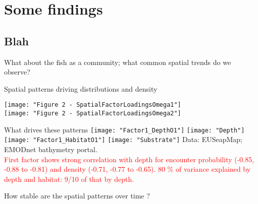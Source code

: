 \documentclass[xcolor=x11names,compress]{beamer}
\renewcommand{\(}{\begin{columns}}
\renewcommand{\)}{\end{columns}}
\newcommand{\<}[1]{\begin{column}{#1}}
\renewcommand{\>}{\end{column}}
\begin{document}
\section{Some findings}
\subsection{Blah}

\begin{frame}
\end{frame}


\begin{frame}
	What about the fish as a community; what common spatial trends do we observe?
\end{frame}


\begin{frame}{Spatial patterns driving distributions and density}

\centering
\texttt{[image: "Figure 2 - SpatialFactorLoadingsOmega1"]}
\\
\texttt{[image: "Figure 2 - SpatialFactorLoadingsOmega2"]}
	
\end{frame}

\begin{frame}{What drives these patterns}
\centering
\texttt{[image: "Factor1\_DepthO1"]}
\texttt{[image: "Depth"]} \\
\pause
\texttt{[image: "Factor1\_HabitatO1"]}
\texttt{[image: "Substrate"]}
\tiny
\hspace{2cm} Data: EUSeapMap; EMODnet bathymetry portal. \\
\pause
\tiny
\textcolor{red}{First factor shows strong correlation with depth for encounter probability
(-0.85, -0.88 to -0.81) and density (-0.71, -0.77 to -0.65). 80 \% of variance
explained by depth and habitat: 9/10 of that by depth.}

\end{frame}

\begin{frame}
        How stable are the spatial patterns over time ?	
\end{frame}
\end{document}
